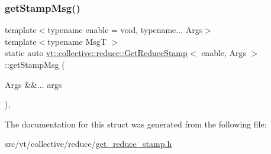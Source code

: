 \subsubsection{\texorpdfstring{get\+Stamp\+Msg()}{getStampMsg()}}
{\footnotesize\ttfamily template$<$typename enable  = void, typename... Args$>$ \\
template$<$typename MsgT $>$ \\
static auto \hyperlink{structvt_1_1collective_1_1reduce_1_1_get_reduce_stamp}{vt\+::collective\+::reduce\+::\+Get\+Reduce\+Stamp}$<$ enable, Args $>$\+::get\+Stamp\+Msg (\begin{DoxyParamCaption}\item[{Args \&\&...}]{args }\end{DoxyParamCaption})\hspace{0.3cm}{\ttfamily [inline]}, {\ttfamily [static]}}



The documentation for this struct was generated from the following file\+:\begin{DoxyCompactItemize}
\item 
src/vt/collective/reduce/\hyperlink{get__reduce__stamp_8h}{get\+\_\+reduce\+\_\+stamp.\+h}\end{DoxyCompactItemize}
